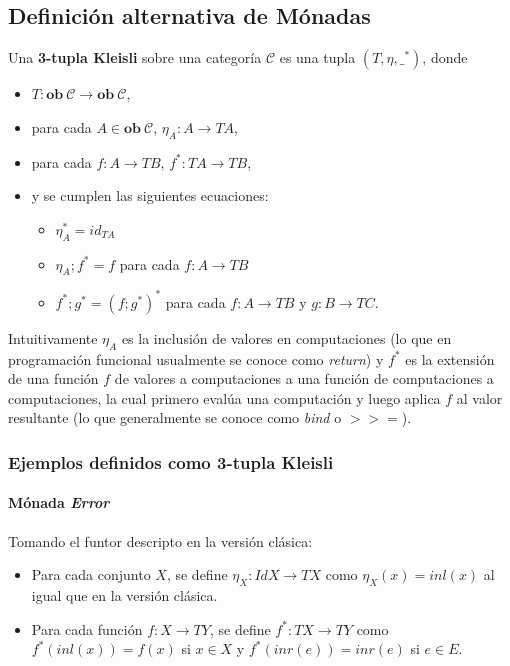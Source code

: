 \subsection{Definición alternativa de Mónadas}\label{monadas:alt}
Una \textbf{3-tupla Kleisli} sobre una categoría $\mathscr{C}$ es una tupla $(\mathit{T},\eta,\_^*)$, donde 
\vspace{-0.75\baselineskip}
\begin{itemize}[noitemsep,label=$\blacktriangleright$]
	\item $\mathit{T} : \mathbf{ob} \ \mathscr{C} \rightarrow \mathbf{ob} \ \mathscr{C}$,
	\item para cada $A \in \mathbf{ob} \ \mathscr{C}$, $\eta_A : A \rightarrow \mathit{T}A$,
	\item para cada $f : A \rightarrow \mathit{T}B$,  $f^* : \mathit{T}A \rightarrow \mathit{T}B$,
	\item y se cumplen las siguientes ecuaciones:
	\begin{itemize}[noitemsep,label=$\bullet$]
		\item $\eta^*_A = id_{\mathit{T}A}$
		\item $\eta_A ; f^* = f$ para cada $f : A \rightarrow \mathit{T}B$
		\item $f^* ; g^* = (f ; g^*)^*$ para cada $f : A \rightarrow \mathit{T}B$ y $g : B \rightarrow \mathit{T}C$.
	\end{itemize}
\end{itemize}

Intuitivamente $\eta_A$ es la inclusión de valores en computaciones (lo que en programación funcional usualmente se conoce como \textit{return}) y $f^*$ es la extensión de una función $f$ de valores a computaciones a una función de computaciones a computaciones, la cual primero evalúa una computación y luego aplica $f$ al valor resultante (lo que generalmente se conoce como \textit{bind} o $>$\hspace{-1mm}$>$\hspace{-1mm}$=$).

\subsubsection{Ejemplos definidos como 3-tupla Kleisli}
\vspace{-0.75\baselineskip}
\paragraph{M\'onada \textit{Error}} Tomando el funtor descripto en la versión clásica:
\vspace{-0.75\baselineskip}
\begin{itemize}[noitemsep, label=$\blacktriangleright$]
	\item Para cada conjunto $X$, se define $\eta_X : \mathit{Id} X \rightarrow \mathit{T} X$ como $\eta_X (x) = inl(x)$ al igual que en la versión clásica.
	\item Para cada función $f : X \rightarrow \mathit{T}Y$, se define $f^* : \mathit{T} X \rightarrow \mathit{T} Y$ como \mbox{$f^*(inl(x)) = f(x)$} si $x \in X$ y $f^*(inr(e)) = inr(e)$ si $e \in E$.   
\end{itemize}

